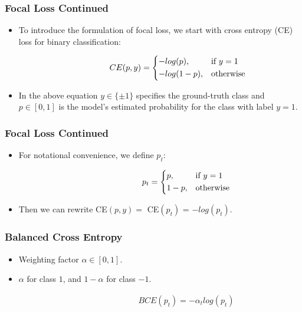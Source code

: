 \documentclass[10pt,fleqn,unknownkeysallowed]{beamer}
\begin{document}
\begin{frame}
	\frametitle{Focal Loss Continued}
	\begin{itemize}
		\item{To introduce the formulation of focal loss, we start with cross entropy (CE) loss for binary classification:}
	\end{itemize}
	\begin{center}
		\begin{align*}
		\quad \quad \quad \quad  \quad \quad
		CE(p,y)= 
		\begin{dcases}
		-log(p),& \text{if } y=1\\
		-log(1-p),              & \text{otherwise}
		\end{dcases}
		\end{align*}
	\end{center}
	\begin{itemize}
		\item{In the above equation $y \in \{\pm 1\}$ specifies the ground-truth class and $p \in [0, 1]$ is the model's estimated probability for the class with label $y=1$.}
	\end{itemize}
\end{frame}


\begin{frame}
	\frametitle{Focal Loss Continued}
	\begin{itemize}
		\item{ For notational convenience, we define $p_t$:}
	\end{itemize}
	\begin{center}
		\begin{align*}
		\quad \quad \quad \quad  \quad \quad \quad \quad
		p_t= 
		\begin{dcases}
		p,& \text{if } y=1\\
		1-p,              & \text{otherwise}
		\end{dcases}
		\end{align*}
	\end{center}
	\begin{itemize}
		\item{Then we can rewrite CE$(p,y) = $ CE$(p_t)$ = $-log(p_t)$.}
	\end{itemize}
\end{frame}

\begin{frame}
	\frametitle{Balanced Cross Entropy}
	\linespread{1.5}
	\begin{itemize}
		\item{Weighting factor $\alpha \in [0,1]$.}
		\item $\alpha$ for class $1$, and $ 1 - \alpha$ for class $-1$.
	\end{itemize}	
	\begin{center}
		\begin{align*}
		\quad \quad \quad \quad  \quad \quad  \quad \quad BCE(p_t) = - \alpha_t log(p_t)
		\end{align*}
	\end{center}
\end{frame}
\end{document}
